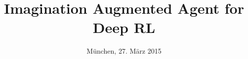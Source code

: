 %
% 
% 
%






\renewcommand{\PersonTitel}{}
\newcommand{\Datum}{\today}

\renewcommand{\PraesentationFusszeileZusatz}{| kn}

\title{Imagination Augmented Agent for Deep RL}
\author{\PersonTitel{} \PersonVorname{} \PersonNachname}
\institute[]{\UniversitaetName}
\date[\Datum]{München, 27. März 2015}
\subject{I2A}




\PraesentationMasterStandard

\PraesentationTitelseite %





\PraesentationMasterKopfzeileDreizeiler

